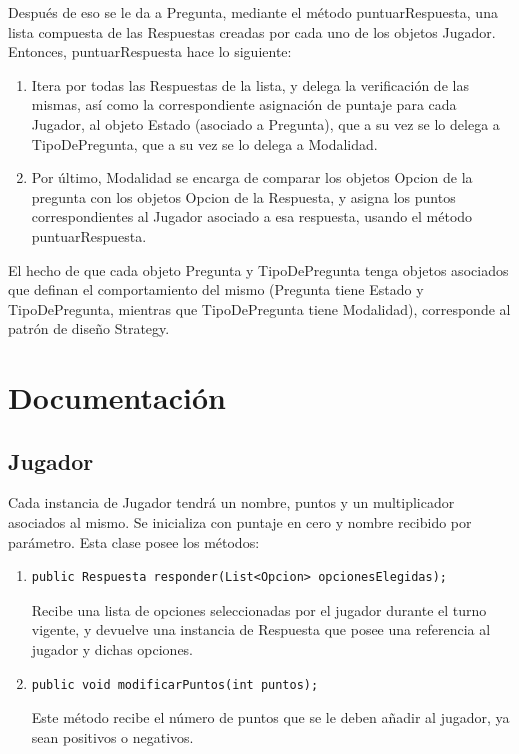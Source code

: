 \documentclass[titlepage,a4paper]{article}
\begin{document}
Después de eso se le da a Pregunta, mediante el método puntuarRespuesta, una lista compuesta de las Respuestas creadas por cada uno de los objetos Jugador. Entonces, puntuarRespuesta hace lo siguiente:
\begin{enumerate}
\item Itera por todas las Respuestas de la lista, y delega la verificación de las mismas, así como la correspondiente asignación de puntaje para cada Jugador, al objeto Estado (asociado a Pregunta), que a su vez se lo delega a TipoDePregunta, que a su vez se lo delega a Modalidad.
\item Por último, Modalidad se encarga de comparar los objetos Opcion de la pregunta con los objetos Opcion de la Respuesta, y asigna los puntos correspondientes al Jugador asociado a esa respuesta, usando el método puntuarRespuesta.
\end{enumerate}

El hecho de que cada objeto Pregunta y TipoDePregunta tenga objetos asociados que definan el comportamiento del mismo (Pregunta tiene Estado y TipoDePregunta, mientras que TipoDePregunta tiene Modalidad), corresponde al patrón de diseño Strategy.


\section{Documentación}

\subsection{Jugador}
Cada instancia de Jugador tendrá un nombre, puntos y un multiplicador asociados al mismo. Se inicializa con puntaje en cero y nombre recibido por parámetro. Esta clase posee los métodos:
\begin{enumerate}
\item \begin{verbatim}public Respuesta responder(List<Opcion> opcionesElegidas);\end{verbatim} Recibe una lista de opciones seleccionadas por el jugador durante el turno vigente, y devuelve una instancia de Respuesta que posee una referencia al jugador y dichas opciones.
\item \begin{verbatim}public void modificarPuntos(int puntos);\end{verbatim} Este método recibe el número de puntos que se le deben añadir al jugador, ya sean positivos o negativos. 
\end{enumerate}
\end{document}
